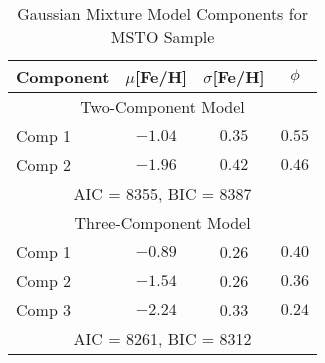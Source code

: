 \documentclass[twocolumn,trackchanges]{aastex63}
\begin{document}
\begin{table}
	\caption{Gaussian Mixture Model Components for MSTO Sample}             %
	\label{table:gmm_parameters}      %
	\centering                          %
	\begin{tabular}{l c c c}        %
		\hline\hline                  %
		Component & $\mu$[Fe/H] & $\sigma$[Fe/H] & $\phi$\\  %

		\hline   
        \multicolumn{4}{c}{Two-Component Model} \\
        \hline
        Comp 1   & $-1.04$ & $0.35$  & $0.55$ \\
        Comp 2   & $-1.96$ & $0.42$ &  $0.46$ \\
        \multicolumn{4}{c}{AIC = 8355, BIC = 8387} \\
        \hline
        \multicolumn{4}{c}{Three-Component Model} \\
        \hline
        Comp 1  & $-0.89$ & 0.26 & $0.40$ \\
        Comp 2  & $-1.54$ & 0.26 & $0.36$ \\
        Comp 3  & $-2.24$ & 0.33 & $0.24$ \\
        \multicolumn{4}{c}{AIC = 8261, BIC = 8312} \\
        \hline        
		\hline                                   %
	\end{tabular}
\end{table}

\end{document}
